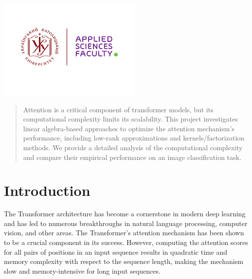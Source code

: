 \begin{titlepage}

\includegraphics[height=5cm]{UCU-Apps.png}\\[1cm] %
 

\vfill %

\end{titlepage}

\begin{abstract}
Attention is a critical component of transformer models, but its computational complexity limits its scalability. This project investigates linear algebra-based approaches to optimize the attention mechanism's performance, including low-rank approximations and kernels/factorization methods. We provide a detailed analysis of the computational complexity and compare their empirical performance on an image classification task.
\end{abstract}

\section{Introduction}
The Transformer architecture has become a cornerstone in modern deep learning and has led to numerous breakthroughs in natural language processing, computer vision, and other areas. The Transformer's attention mechanism has been shown to be a crucial component in its success. However, computing the attention scores for all pairs of positions in an input sequence results in quadratic time and memory complexity with respect to the sequence length, making the mechanism slow and memory-intensive for long input sequences.

